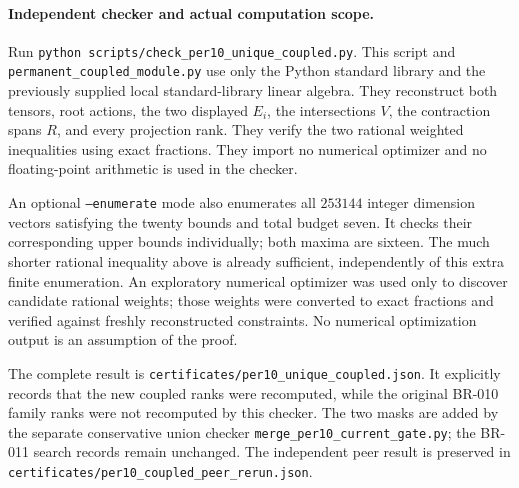 \paragraph{Independent checker and actual computation scope.}
Run \texttt{python scripts/check\_per10\_unique\_coupled.py}.
This script and \texttt{permanent\_coupled\_module.py} use only the
Python standard library and the previously supplied local standard-library
linear algebra.  They reconstruct both tensors, root actions, the two
displayed $E_i$, the intersections $V$, the contraction spans $R$, and
every projection rank.  They verify the two rational weighted inequalities
using exact fractions.  They import no numerical optimizer and no
floating-point arithmetic is used in the checker.

An optional \texttt{--enumerate} mode also enumerates all $253144$
integer dimension vectors satisfying the twenty bounds and total budget
seven.  It checks their corresponding upper bounds individually; both
maxima are sixteen.  The much shorter rational inequality above is
already sufficient, independently of this extra finite enumeration.
An exploratory numerical optimizer was used only to discover candidate
rational weights; those weights were converted to exact fractions and
verified against freshly reconstructed constraints.  No numerical
optimization output is an assumption of the proof.

The complete result is \texttt{certificates/per10\_unique\_coupled.json}.
It explicitly records that the new coupled ranks were recomputed, while
the original BR-010 family ranks were not recomputed by this checker.
The two masks are added by the separate conservative union checker
\texttt{merge\_per10\_current\_gate.py}; the BR-011 search records
remain unchanged.  The independent peer result is preserved in
\texttt{certificates/per10\_coupled\_peer\_rerun.json}.
